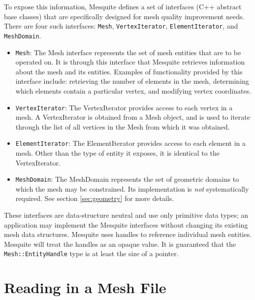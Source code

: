 To expose this information, Mesquite defines a set of interfaces 
(C++ abstract base classes) that are specifically designed for mesh
quality improvement needs.  There are four such interfaces: \texttt{Mesh},
\texttt{VertexIterator}, \texttt{ElementIterator}, and \texttt{MeshDomain}.
\begin{itemize}
\item \texttt{Mesh}: The Mesh interface represents the set of mesh
entities that are to be operated on.  It is through this interface
that Mesquite retrieves information about the mesh and its entities.
Examples of functionality provided by this interface include:
retrieving the number of elements in the mesh, determining which
elements contain a particular vertex, and modifying vertex
coordinates.
\item \texttt{VertexIterator}: The VertexIterator provides access to each
vertex in a mesh.  A VertexIterator is obtained from a Mesh object,
and is used to iterate through the list of all vertices in the Mesh
from which it was obtained.
\item \texttt{ElementIterator}: The ElementIterator provides access to
each element in a mesh.  Other than the type of entity it exposes, it
is identical to the VertexIterator.
\item \texttt{MeshDomain}: The MeshDomain represents the set of geometric
domains to which the mesh may be constrained. Its implementation is \emph{not} systematically 
required. See section \ref{sec:geometry} for more details. 
\end{itemize}
These interfaces are data-structure neutral and use only primitive
data types; an application may implement the Mesquite interfaces
without changing its existing mesh data structures.  Mesquite uses
handles to reference individual mesh entities.  Mesquite will treat
the handles as an opaque value.  It is guaranteed that the {\tt Mesh::EntityHandle} type is at least the size of a pointer. 

\section{Reading in a Mesh File} \label{sec:meshFiles}

